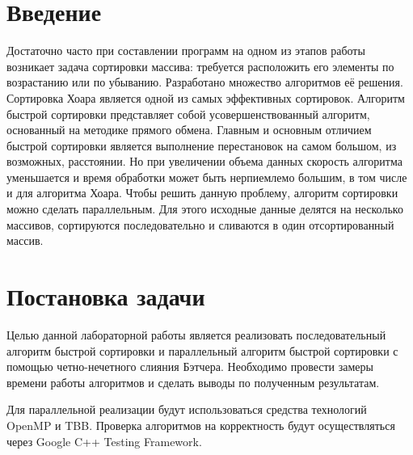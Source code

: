 \documentclass{report}
\begin{document}
\setcounter{page}{2}
\setcounter{page}{2}

\section*{Введение}
\par
Достаточно часто при составлении программ на одном из этапов работы возникает задача
сортировки массива: требуется расположить его элементы по возрастанию или по убыванию.
Разработано множество алгоритмов её решения. Сортировка Хоара является одной из самых эффективных сортировок.
Алгоритм быстрой сортировки представляет собой усовершенствованный алгоритм, основанный на методике прямого обмена.
Главным и основным отличием быстрой сортировки является выполнение перестановок на самом большом, из возможных, расстоянии.
Но при увеличении объема данных скорость алгоритма уменьшается и время обработки может быть нерпиемлемо большим, в том числе и для алгоритма Хоара. 
Чтобы решить данную проблему, алгоритм сортировки можно сделать параллельным. 
Для этого исходные данные делятся на несколько массивов, сортируются последовательно и сливаются в один отсортированный массив. 
\newpage

\section*{Постановка задачи}
Целью данной лабораторной работы является реализовать последовательный алгоритм быстрой сортировки и параллельный алгоритм быстрой сортировки с помощью четно-нечетного слияния Бэтчера.  Необходимо провести замеры времени работы алгоритмов и сделать выводы по полученным результатам.
\par Для параллельной реализации будут использоваться средства технологий OpenMP и TBB. Проверка алгоритмов на корректность будут осуществляться через Google C++ Testing Framework.
\newpage

\end{document}
